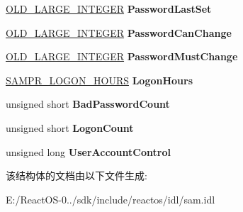 \begin{DoxyCompactItemize}
\item 
\mbox{\label{struct___s_a_m_p_r___u_s_e_r___l_o_g_o_n___i_n_f_o_r_m_a_t_i_o_n_a4b82f7b9a6f4b13bbd25c4869cbd023f}} 
\hyperlink{struct___o_l_d___l_a_r_g_e___i_n_t_e_g_e_r}{O\+L\+D\+\_\+\+L\+A\+R\+G\+E\+\_\+\+I\+N\+T\+E\+G\+ER} {\bfseries Password\+Last\+Set}
\item 
\mbox{\label{struct___s_a_m_p_r___u_s_e_r___l_o_g_o_n___i_n_f_o_r_m_a_t_i_o_n_a8ea8957a23a18cd386bb17fd87ba330e}} 
\hyperlink{struct___o_l_d___l_a_r_g_e___i_n_t_e_g_e_r}{O\+L\+D\+\_\+\+L\+A\+R\+G\+E\+\_\+\+I\+N\+T\+E\+G\+ER} {\bfseries Password\+Can\+Change}
\item 
\mbox{\label{struct___s_a_m_p_r___u_s_e_r___l_o_g_o_n___i_n_f_o_r_m_a_t_i_o_n_a7a2d5536f6713e8171135a61729aa366}} 
\hyperlink{struct___o_l_d___l_a_r_g_e___i_n_t_e_g_e_r}{O\+L\+D\+\_\+\+L\+A\+R\+G\+E\+\_\+\+I\+N\+T\+E\+G\+ER} {\bfseries Password\+Must\+Change}
\item 
\mbox{\label{struct___s_a_m_p_r___u_s_e_r___l_o_g_o_n___i_n_f_o_r_m_a_t_i_o_n_a6f7cae67fb472f4f3ceef4ff4c678a72}} 
\hyperlink{struct___s_a_m_p_r___l_o_g_o_n___h_o_u_r_s}{S\+A\+M\+P\+R\+\_\+\+L\+O\+G\+O\+N\+\_\+\+H\+O\+U\+RS} {\bfseries Logon\+Hours}
\item 
\mbox{\label{struct___s_a_m_p_r___u_s_e_r___l_o_g_o_n___i_n_f_o_r_m_a_t_i_o_n_a59c46904669b87bfb8a6140565aadd24}} 
unsigned short {\bfseries Bad\+Password\+Count}
\item 
\mbox{\label{struct___s_a_m_p_r___u_s_e_r___l_o_g_o_n___i_n_f_o_r_m_a_t_i_o_n_a935920e91ef25a2d7dd402c8472bec23}} 
unsigned short {\bfseries Logon\+Count}
\item 
\mbox{\label{struct___s_a_m_p_r___u_s_e_r___l_o_g_o_n___i_n_f_o_r_m_a_t_i_o_n_a31adc3c9e86724b8a84b36e9eda17e0c}} 
unsigned long {\bfseries User\+Account\+Control}
\end{DoxyCompactItemize}


该结构体的文档由以下文件生成\+:\begin{DoxyCompactItemize}
\item 
E\+:/\+React\+O\+S-\/0../sdk/include/reactos/idl/sam.\+idl\end{DoxyCompactItemize}
